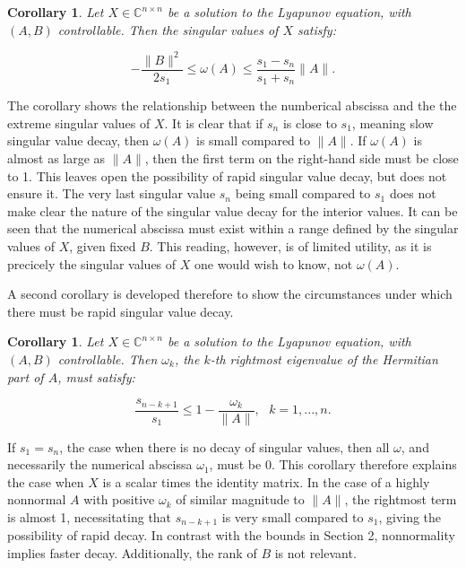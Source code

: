 \documentclass[12pt]{scrartcl}
\newcommand{\Cnn}{\mathbb{C}^{n \times n}}
\newtheorem{mycor}[mydef]{Corollary}
\begin{document}
\begin{mycor}

Let $X \in \Cnn$ be a solution to the Lyapunov equation, with $(A,B)$ controllable. Then the singular values of $X$ satisfy:

$$-\frac{\|B\|^{2}}{2s_{1}} \leq \omega(A) \leq \frac{s_{1}-s_{n}}{s_{1}+s_{n}} \|A\|.$$

\end{mycor}

The corollary shows the relationship between the numberical abscissa and the the extreme singular values of $X$. It is clear that if $s_{n}$ is close to $s_{1}$, meaning slow singular value decay, then $\omega(A)$ is small compared to $\|A\|$. If $\omega(A)$ is almost as large as $\|A\|$, then the first term on the right-hand side must be close to 1. This leaves open the possibility of rapid singular value decay, but does not ensure it. The very last singular value $s_{n}$ being small compared to $s_{1}$ does not make clear the nature of the singular value decay for the interior values. It can be seen that the numerical abscissa must exist within a range defined by the singular values of $X$, given fixed $B$. This reading, however, is of limited utility, as it is precicely the singular values of $X$ one would wish to know, not $\omega(A)$.

A second corollary is developed therefore to show the circumstances under which there must be rapid singular value decay.

\begin{mycor}

Let $X \in \Cnn$ be a solution to the Lyapunov equation, with $(A,B)$ controllable. Then $\omega_{k}$, the $k$-th rightmost eigenvalue of the Hermitian part of $A$, must satisfy:

$$\frac{s_{n-k+1}}{s_{1}} \leq 1 - \frac{\omega_{k}}{\|A\|}, \text{    }k=1,...,n.$$

\end{mycor}

If $s_{1}=s_{n}$, the case when there is no decay of singular values, then all $\omega$, and necessarily the numerical abscissa $\omega_{1}$, must be 0. This corollary therefore explains the case when $X$ is a scalar times the identity matrix. In the case of a highly nonnormal $A$ with positive $\omega_{k}$ of similar magnitude to $\|A\|$, the rightmost term is almost 1, necessitating that $s_{n-k+1}$ is very small compared to $s_{1}$, giving the possibility of rapid decay. In contrast with the bounds in Section 2, nonnormality implies faster decay. Additionally, the rank of $B$ is not relevant. 
\end{document}
